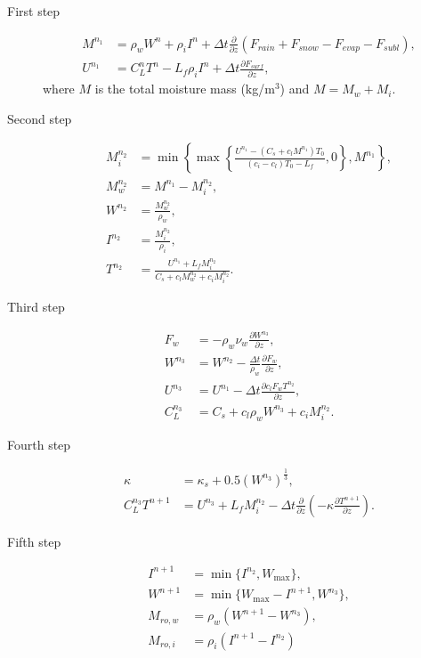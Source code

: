 \begin{description}

\item[First step]

\begin{align}
 M^{n_1} &= \rho_w W^n + \rho_i I^n + \Delta t \frac{\partial}{\partial z}( F_{rain} + F_{snow} - F_{evap} - F_{subl} ), \\
 U^{n_1} &= C_L^n T^n - L_f \rho_i I^n + \Delta t \frac{\partial F_{surf}}{\partial z},
\end{align}
where $M$ is the total moisture mass (kg/m$^3$) and $M = M_w + M_i$.


\item[Second step]
\begin{align}
 M_i^{n_2} &= \min\left\{ \max\left\{ \frac{U^{n_1}-(C_s+c_lM^{n_1})T_0}{(c_i-c_l)T_0-L_f}, 0 \right\}, M^{n_1} \right\}, \\
 M_w^{n_2} &= M^{n_1} - M_i^{n_2}, \\
 W^{n_2} &= \frac{M_w^{n_2}}{\rho_w}, \\
 I^{n_2} &= \frac{M_i^{n_2}}{\rho_i}, \\
 T^{n_2} &= \frac{U^{n_1} + L_f M_i^{n_2}}{C_s + c_l M_w^{n_2} + c_i M_i^{n_2}}.
\end{align}


\item[Third step]
\begin{align}
 F_w &= - \rho_w\nu_w\frac{\partial W^{n_3}}{\partial z}, \\
 W^{n_3} &= W^{n_2} - \frac{\Delta t}{\rho_w} \frac{\partial F_w}{\partial z}, \\
 U^{n_3} &= U^{n_1} - \Delta t \frac{\partial c_l F_w T^{n_2}}{\partial z}, \\
 C_L^{n_3} &= C_s + c_l \rho_w W^{n_3} + c_i M_i^{n_2}.
\end{align}

\item[Fourth step]
\begin{align}
 \kappa &= \kappa_s + 0.5 (W^{n_3})^\frac{1}{3}, \\
 C_L^{n_3} T^{n+1} &= U^{n_3} + L_f M_i^{n_2}
 - \Delta t \frac{\partial}{\partial z} \left( -\kappa \frac{\partial T^{n+1}}{\partial z} \right).
\end{align}



\item[Fifth step]
\begin{align}
 I^{n+1} &= \min\{ I^{n_2}, W_\mathrm{max} \}, \\
 W^{n+1} &= \min\{ W_\mathrm{max} - I^{n+1}, W^{n_3} \}, \\
 M_{ro,w} &= \rho_w ( W^{n+1} - W^{n_3} ), \\
 M_{ro,i} &= \rho_i ( I^{n+1} - I^{n_2} )
\end{align}

\end{description}



